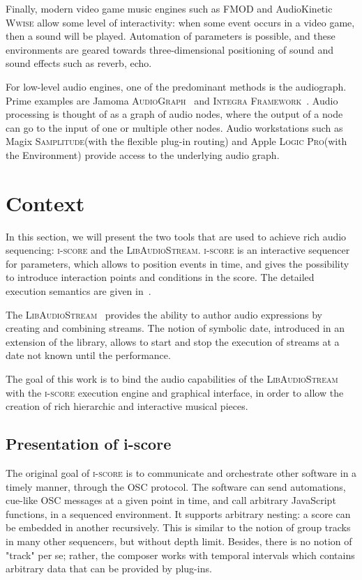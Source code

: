 \documentclass{article}
\newcommand*{\LibAudioStream}{\textsc{LibAudioStream}\xspace}
\newcommand*{\iscore}{\textsc{i-score}\xspace}
\newcommand*{\logic}{Apple \textsc{Logic Pro}\xspace}
\newcommand*{\samplitude}{Magix \textsc{Samplitude}\xspace}
\newcommand*{\jamomaaudiograph}{Jamoma \textsc{AudioGraph}\xspace}
\newcommand*{\integraframework}{\textsc{Integra Framework}\xspace}
\newcommand*{\wwise}{AudioKinetic \textsc{Wwise}\xspace}
\newcommand*{\fmod}{\textsc{FMOD}\xspace}
\begin{document}
Finally, modern video game music engines such as \fmod and \wwise allow some level of interactivity: when some event occurs in a video game, then a sound will be played. 
Automation of parameters is possible, and these environments are geared towards three-dimensional positioning of sound and sound effects such as reverb, echo.

For low-level audio engines, one of the predominant methods is the audiograph.
Prime examples are \jamomaaudiograph~\cite{place2010jamoma} and \integraframework~\cite{bullock2011integra}.
Audio processing is thought of as a graph of audio nodes, where the output of a node can go to the input of one or multiple other nodes.
Audio workstations such as \samplitude (with the flexible plug-in routing) and \logic (with the Environment) provide access to the underlying audio graph.

\section{Context}
In this section, we will present the two tools that are used to achieve 
rich audio sequencing: \iscore and the \LibAudioStream.
\iscore is an interactive sequencer for parameters, which allows to position events 
in time, and gives the possibility to introduce interaction points and 
conditions in the score.
The detailed execution semantics are given in~\cite{celerier2015ossia}.

The \LibAudioStream~\cite{letzlibaudiostream} provides the ability to author audio expressions
by creating and combining streams. The notion of symbolic date, introduced in an extension of the library,
allows to start and stop the execution of streams at a date not known until the performance.

The goal of this work is to bind the audio capabilities of the \LibAudioStream 
with the \iscore execution engine and graphical interface, in order to allow 
the creation of rich hierarchic and interactive musical pieces.

\subsection{Presentation of i-score}
The original goal of \iscore is to communicate and orchestrate other software in a timely manner, 
through the OSC protocol.
The software can send automations, cue-like OSC messages at a given point in time, and call arbitrary JavaScript functions, in a sequenced environment.
It supports arbitrary nesting: a score can be embedded in another recursively.
This is similar to the notion of group tracks in many other sequencers, but without depth limit. 
Besides, there is no notion of "track" per se; rather, the composer works with 
temporal intervals which contains arbitrary data that can be provided by plug-ins.
\end{document}
